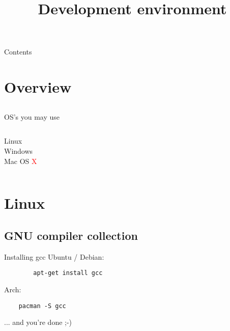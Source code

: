 
\newcommand{\topic}{
	Development environment
}


\title{\topic}
\supertitle{\course}
\date{}



\maketitle

\begin{frame}{Contents}
	\tableofcontents
\end{frame}

\section{Overview}
\subsection{}
\begin{frame}{OS's you may use}
	\begin{columns}[T]
		Linux\\
		\uncover<2->{\textcolor{green}{recommended}}
		Windows\\
		\uncover<3->{\textcolor{orange}{supported}}
		Mac OS \textcolor<4->{red}{X}
	\end{columns}
\end{frame}
\section{Linux}
\subsection{GNU compiler collection}
\begin{frame}[fragile]{Installing gcc}
	Ubuntu / Debian: 
	\begin{lstlisting}
		apt-get install gcc
	\end{lstlisting}
	Arch:
	\begin{lstlisting}
	pacman -S gcc
	\end{lstlisting}
	... and you're done ;-)
\end{frame}
